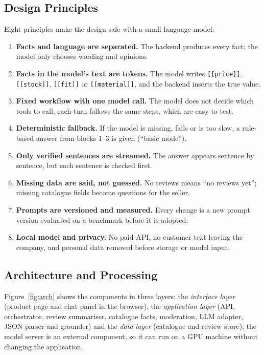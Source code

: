 \subsection{Design Principles}
Eight principles make the design safe with a small language model:
\begin{enumerate}[label=\textbf{D\arabic*.}]
  \item \textbf{Facts and language are separated.} The backend produces every fact; the model only chooses wording and opinions.
  \item \textbf{Facts in the model's text are tokens.} The model writes \texttt{[[price]]}, \texttt{[[stock]]}, \texttt{[[fit]]} or \texttt{[[material]]}, and the backend inserts the true value.
  \item \textbf{Fixed workflow with one model call.} The model does not decide which tools to call; each turn follows the same steps, which are easy to test.
  \item \textbf{Deterministic fallback.} If the model is missing, fails or is too slow, a rule-based answer from blocks 1--3 is given (``basic mode'').
  \item \textbf{Only verified sentences are streamed.} The answer appears sentence by sentence, but each sentence is checked first.
  \item \textbf{Missing data are said, not guessed.} No reviews means ``no reviews yet''; missing catalogue fields become questions for the seller.
  \item \textbf{Prompts are versioned and measured.} Every change is a new prompt version evaluated on a benchmark before it is adopted.
  \item \textbf{Local model and privacy.} No paid API, no customer text leaving the company, and personal data removed before storage or model input.
\end{enumerate}

\subsection{Architecture and Processing}
\label{sec:design}
Figure~\ref{fig:arch} shows the components in three layers: the \emph{interface layer} (product page and chat panel in the browser), the \emph{application layer} (API, orchestrator, review summariser, catalogue facts, moderation, LLM adapter, JSON parser and grounder) and the \emph{data layer} (catalogue and review store); the model server is an external component, so it can run on a GPU machine without changing the application.

